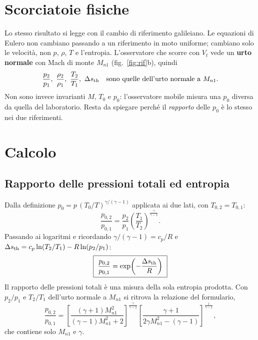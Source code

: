 \documentclass[11pt,a4paper]{article}
\newcommand{\sth}{s_{\rm th}}
\newcommand{\Mn}{M_{n1}}
\newcommand{\kk}{\frac{\gamma}{\gamma-1}}
\begin{document}
\section{Scorciatoie fisiche}
Lo stesso risultato si legge con il cambio di riferimento galileiano. Le equazioni di Eulero non cambiano
passando a un riferimento in moto uniforme; cambiano solo le velocità, non $p$, $\rho$, $T$ e l'entropia.
L'osservatore che scorre con $V_t$ vede un \textbf{urto normale} con Mach di monte $\Mn$
(fig.~\ref{fig:rif}b), quindi
\[
  \frac{p_2}{p_1},\ \frac{\rho_2}{\rho_1},\ \frac{T_2}{T_1},\ \Delta\sth
  \quad\text{sono quelle dell'urto normale a } \Mn .
\]
Non sono invece invarianti $M$, $T_0$ e $p_0$: l'osservatore mobile misura una $p_0$ diversa da quella del
laboratorio. Resta da spiegare perché il \emph{rapporto} delle $p_0$ è lo stesso nei due riferimenti.

\section{Calcolo}
\subsection{Rapporto delle pressioni totali ed entropia}
Dalla definizione $p_0=p\,(T_0/T)^{\gamma/(\gamma-1)}$ applicata ai due lati, con $T_{0,2}=T_{0,1}$:
\[
  \frac{p_{0,2}}{p_{0,1}}=\frac{p_2}{p_1}\left(\frac{T_1}{T_2}\right)^{\kk} .
\]
Passando ai logaritmi e ricordando $\gamma/(\gamma-1)=c_p/R$ e $\Delta\sth=c_p\ln(T_2/T_1)-R\ln(p_2/p_1)$:
\[
  \boxed{\ \frac{p_{0,2}}{p_{0,1}}=\exp\!\left(-\frac{\Delta\sth}{R}\right)\ }
\]
Il rapporto delle pressioni totali è una misura della sola entropia prodotta. Con $p_2/p_1$ e $T_2/T_1$
dell'urto normale a $\Mn$ si ritrova la relazione del formulario,
\[
  \frac{p_{0,2}}{p_{0,1}}=
  \left[\frac{(\gamma+1)\Mn^2}{(\gamma-1)\Mn^2+2}\right]^{\kk}
  \left[\frac{\gamma+1}{2\gamma \Mn^2-(\gamma-1)}\right]^{\frac{1}{\gamma-1}},
\]
che contiene solo $\Mn$ e $\gamma$.
\end{document}
